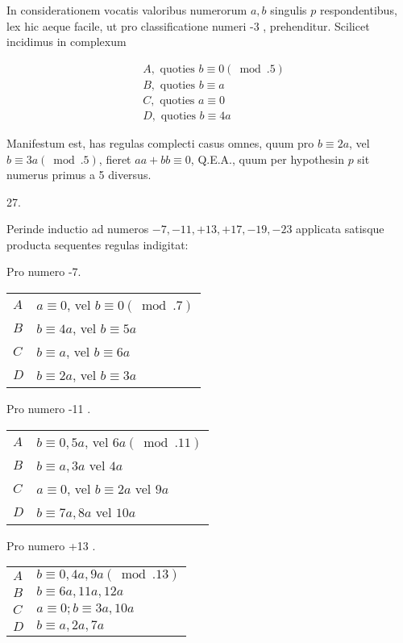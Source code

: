 \documentclass[10pt]{article}
\begin{document}
In considerationem vocatis valoribus numerorum \(a, b\) singulis \(p\) respondentibus, lex hic aeque facile, ut pro classificatione numeri -3 , prehenditur. Scilicet incidimus in complexum

\[
\begin{aligned}
& A, \text { quoties } b \equiv 0(\bmod .5) \\
& B, \text { quoties } b \equiv a \\
& C, \text { quoties } a \equiv 0 \\
& D, \text { quoties } b \equiv 4 a
\end{aligned}
\]

Manifestum est, has regulas complecti casus omnes, quum pro \(b \equiv 2 a\), vel \(b \equiv 3 a(\bmod .5)\), fieret \(a a+b b \equiv 0\), Q.E.A., quum per hypothesin \(p\) sit numerus primus a 5 diversus.

27.

Perinde inductio ad numeros \(-7,-11,+13,+17,-19,-23\) applicata satisque producta sequentes regulas indigitat:

Pro numero -7.

\begin{center}
\begin{tabular}{l|l}
\(A\) & \(a \equiv 0\), vel \(b \equiv 0(\bmod .7)\) \\
\(B\) & \(b \equiv 4 a\), vel \(b \equiv 5 a\) \\
\(C\) & \(b \equiv a\), vel \(b \equiv 6 a\) \\
\(D\) & \(b \equiv 2 a\), vel \(b \equiv 3 a\) \\
\end{tabular}
\end{center}

Pro numero -11 .

\begin{center}
\begin{tabular}{l|l}
\(A\) & \(b \equiv 0,5 a\), vel \(6 a(\bmod .11)\) \\
\(B\) & \(b \equiv a, 3 a\) vel \(4 a\) \\
\(C\) & \(a \equiv 0\), vel \(b \equiv 2 a\) vel \(9 a\) \\
\(D\) & \(b \equiv 7 a, 8 a\) vel \(10 a\) \\
\end{tabular}
\end{center}

Pro numero +13 .

\begin{center}
\begin{tabular}{l|l}
\(A\) & \(b \equiv 0,4 a, 9 a(\bmod .13)\) \\
\(B\) & \(b \equiv 6 a, 11 a, 12 a\) \\
\(C\) & \(a \equiv 0 ; b \equiv 3 a, 10 a\) \\
\(D\) & \(b \equiv a, 2 a, 7 a\) \\
\end{tabular}
\end{center}
\end{document}
